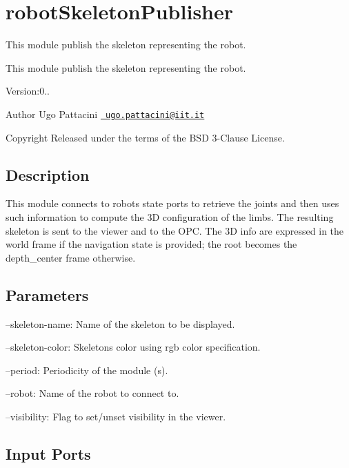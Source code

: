 \section{robot\+Skeleton\+Publisher}
\label{group__robotSkeletonPublisher}


This module publish the skeleton representing the robot.  


This module publish the skeleton representing the robot. 

Version\+:0.. \begin{DoxyAuthor}{Author}
Ugo Pattacini \href{mailto:ugo.pattacini@iit.it}{\texttt{ ugo.\+pattacini@iit.\+it}} ~\newline
 
\end{DoxyAuthor}
\begin{DoxyCopyright}{Copyright}
Released under the terms of the B\+SD 3-\/Clause License. 
\end{DoxyCopyright}
\hypertarget{group__skeletonViewer_intro_sec}{}\subsection{Description}\label{group__skeletonViewer_intro_sec}
This module connects to robot\textquotesingle{}s state ports to retrieve the joints and then uses such information to compute the 3D configuration of the limbs. The resulting skeleton is sent to the viewer and to the O\+PC. The 3D info are expressed in the world frame if the navigation state is provided; the root becomes the depth\+\_\+center frame otherwise.\hypertarget{group__skeletonViewer_parameters_sec}{}\subsection{Parameters}\label{group__skeletonViewer_parameters_sec}

\begin{DoxyItemize}
\item --skeleton-\/name\+: Name of the skeleton to be displayed.
\item --skeleton-\/color\+: Skeleton\textquotesingle{}s color using rgb color specification.
\item --period\+: Periodicity of the module (s).
\item --robot\+: Name of the robot to connect to.
\item --visibility\+: Flag to set/unset visibility in the viewer. 
\end{DoxyItemize}\hypertarget{group__skeletonViewer_inputports_sec}{}\subsection{Input Ports}\label{group__skeletonViewer_inputports_sec}

